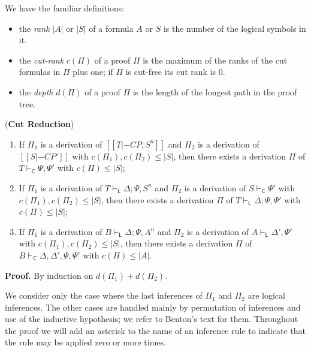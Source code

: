 We have the familiar definitions: 
\begin{itemize}
\item the \emph{rank} $|A|$ or $|S|$ of a formula $A$ or $S$ is the number of the logical symbols in it.
\item the \emph{cut-rank} $c(\Pi)$ of a proof $\Pi$ is the maximum of the ranks of the cut formulas in $\Pi$ plus one; 
if $\Pi$ is cut-free its cut rank is 0.
\item the \emph{depth} $d(\Pi)$ of a proof $\Pi$ is the length of the longest path in the proof tree.
\end{itemize}
\begin{lemma}
\end{lemma} ({\bf Cut Reduction}) 
\begin{enumerate}
\item If $\Pi_1$ is a derivation of $[[T |-C P, S^n]]$ and  $\Pi_2$ is a derivation of $[[S |-C P']]$ with 
$c(\Pi_1), c(\Pi_2) \leq |S|$, then there exists a derivation $\Pi$ of $T\vdash_{\mathsf{C}} \Psi, \Psi'$ with $c(\Pi) \leq |S|$;
\item If $\Pi_1$ is a derivation of $T \vdash_{\mathsf{L}} \Delta; \Psi, S^n$ and  $\Pi_2$ is a derivation of $S \vdash_{\mathsf{C}}\Psi'$ with 
$c(\Pi_1), c(\Pi_2) \leq |S|$, then there exists a derivation $\Pi$ of $T\vdash_{\mathsf{L}} \Delta; \Psi, \Psi'$ with $c(\Pi) \leq |S|$;
\item If $\Pi_1$ is a derivation of $B\vdash_{\mathsf{L}} \Delta; \Psi, A^n$ and  $\Pi_2$ is a derivation of $A \vdash_{\mathsf{L}}\Delta', \Psi'$ with $c(\Pi_1), c(\Pi_2) \leq |S|$, then there exists a derivation $\Pi$ of $B\vdash_{\mathsf{C}}\Delta, \Delta', \Psi, \Psi'$ with $c(\Pi) \leq |A|$.
\end{enumerate}

\noindent
{\bf Proof.} By induction on $d(\Pi_1) + d(\Pi_2)$.   

\noindent
We consider only the case where the last inferences of $\Pi_1$ and $\Pi_2$ are logical inferences. The other cases 
are handled mainly by permutation of inferences and use of the inductive hypothesis; we refer to Benton's text for them.  Throughout the proof we will add an asterisk to the name of an inference rule to indicate that the rule may be applied zero or more times.

\vspace{1ex}


